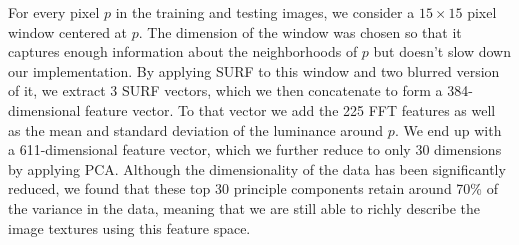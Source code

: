 For every pixel $p$ in the training and testing images, we consider a $15\times15$ pixel window centered at $p$. The dimension of the window was chosen so that it captures enough information about the neighborhoods of $p$ but doesn't slow down our implementation. By applying SURF to this window and two blurred version of it, we extract 3 SURF vectors, which we then concatenate to form a 384-dimensional feature vector. To that vector we add the 225 FFT features as well as the mean and standard deviation of the luminance around $p$. We end up with a 611-dimensional feature vector, which we further reduce to only $30$ dimensions by applying PCA.  Although the dimensionality of the data has been significantly reduced, we found that these top 30 principle components retain around 70\% of the variance in the data, meaning that we are still able to richly describe the image textures using this feature space.